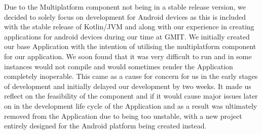 Due to the Multiplatform component not being in a stable release version, we decided to solely focus on development for Android devices as this is included with the stable release of Kotlin/JVM and along with our experience in creating applications for android devices during our time at GMIT.
\newline
\newline
We initially created our base Application with the intention of utilising the multiplatform component for our application. We soon found that it was very difficult to run and in some instances would not compile and would sometimes render the Application completely inoperable. This came as a cause for concern for us in the early stages of development and initially delayed our development by two weeks. It made us reflect on the feasibility of the component and if it would cause major issues later on in the development life cycle of the Application and as a result was ultimately removed from the Application due to being too unstable, with a new project entirely designed for the Android platform being created instead.

